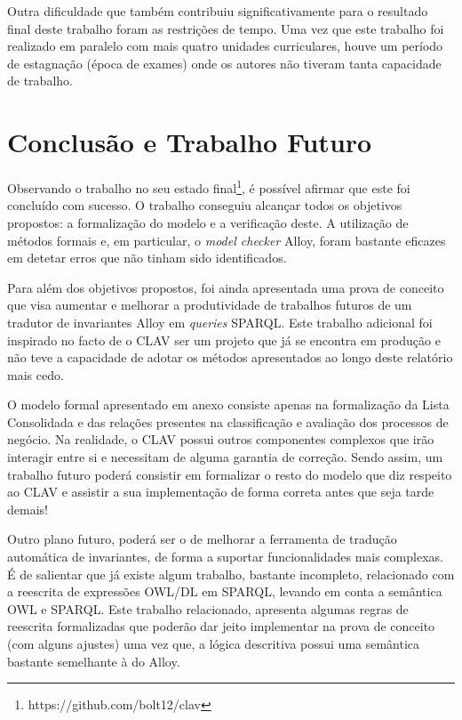 \documentclass[tikz,runningheads,a4paper]{llncs}
\begin{document}
Outra dificuldade que também contribuiu significativamente para o resultado final deste trabalho foram as restrições de tempo. Uma vez que este trabalho foi realizado em paralelo com mais quatro unidades curriculares, houve um período de estagnação (época de exames) onde os autores não tiveram tanta capacidade de trabalho.

\section{Conclusão e Trabalho Futuro} \label{SecConclusion}

Observando o trabalho no seu estado final\footnote{https://github.com/bolt12/clav}, é possível afirmar que este foi concluído com sucesso. O trabalho conseguiu alcançar todos os objetivos propostos: a formalização do modelo e a verificação deste. A utilização de métodos formais e, em particular, o \textit{model checker} Alloy, foram bastante eficazes em detetar erros que não tinham sido identificados.

Para além dos objetivos propostos, foi ainda apresentada uma prova de conceito que visa aumentar e melhorar a produtividade de trabalhos futuros de um tradutor de invariantes Alloy em \textit{queries} SPARQL. Este trabalho adicional foi inspirado no facto de o CLAV ser um projeto que já se encontra em produção e não teve a capacidade de adotar os métodos apresentados ao longo deste relatório mais cedo.

O modelo formal apresentado em anexo consiste apenas na formalização da Lista Consolidada e das relações presentes na classificação e avaliação dos processos de negócio. Na realidade, o CLAV possui outros componentes complexos que irão interagir entre si e necessitam de alguma garantia de correção. Sendo assim, um trabalho futuro poderá consistir em formalizar o resto do modelo que diz respeito ao CLAV e assistir a sua implementação de forma correta antes que seja tarde demais! 

Outro plano futuro, poderá ser o de melhorar a ferramenta de tradução automática de invariantes, de forma a suportar funcionalidades mais complexas. É de salientar que já existe algum trabalho, bastante incompleto, relacionado com a reescrita de expressões OWL/DL\cite{q-trad} em SPARQL, levando em conta a semântica OWL e SPARQL. Este trabalho relacionado, apresenta algumas regras de reescrita formalizadas que poderão dar jeito implementar na prova de conceito (com alguns ajustes) uma vez que, a lógica descritiva possui uma semântica bastante semelhante à do Alloy.
\end{document}
